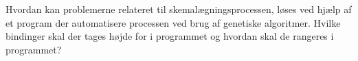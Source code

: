 Hvordan kan problemerne relateret til skemalægningsprocessen, løses ved hjælp af et program der automatisere processen ved brug af genetiske algoritmer. Hvilke bindinger skal der tages højde for i programmet og hvordan skal de rangeres i programmet?